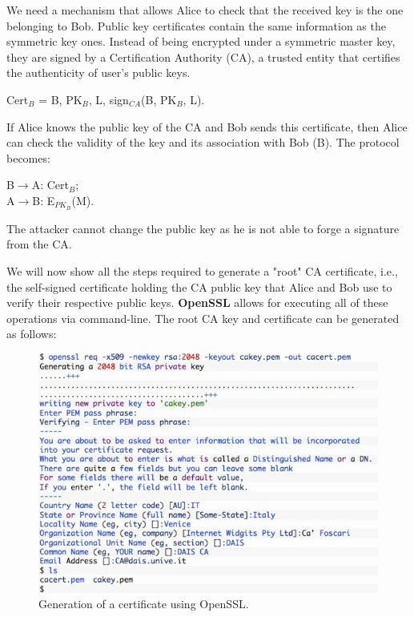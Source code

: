 \documentclass[a4paper, 12pt]{report}
\begin{document}
We need a mechanism that allows Alice to check that the received key is the one belonging to Bob. Public key certificates contain the same information as the symmetric key ones. Instead of being encrypted under a symmetric master key, they are signed by a Certification Authority (CA), a trusted entity that certifies the authenticity of user's public keys.

\begin{center}
	Cert$_B$ = B, PK$_B$, L, sign$_{CA}$(B, PK$_B$, L).
\end{center} 

If Alice knows the public key of the CA and Bob sends this certificate, then Alice can check the validity of the key and its association with Bob (B). The protocol becomes:
\begin{center}
	B$\rightarrow$A: Cert$_B$;\\
	A$\rightarrow$B: E$_{PK_B}$(M).
\end{center}
The attacker cannot change the public key as he is not able to forge a signature from the CA.

We will now show all the steps required to generate a "root" CA certificate, i.e., the self-signed certificate holding the CA public key that Alice and Bob use to verify their respective public keys. \textbf{OpenSSL} allows for executing all of these operations via command-line. The root CA key and certificate can be generated as follows:

\begin{figure}[H]
	\centering
	\includegraphics[scale=0.7]{images/Lec23/cert1.png}
	\caption{Generation of a certificate using OpenSSL.}
	\label{fig:cert1}
\end{figure}
\end{document}

